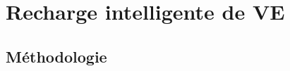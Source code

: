 \documentclass[french]{beamer}
\begin{document}
{%
% 
% 
% 


\section{Recharge intelligente de VE}

\subsection{Méthodologie}


}
\end{document}
